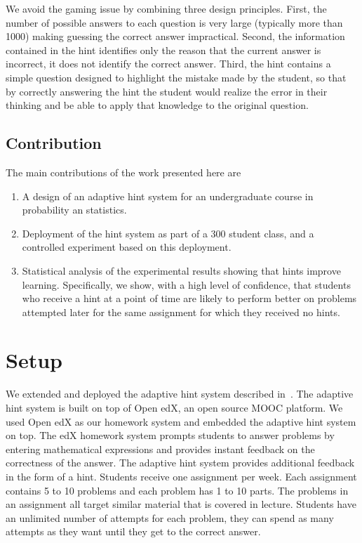 \documentclass{llncs2e/llncs}
\begin{document}
We avoid the gaming issue by combining three design principles. First, the number of possible answers to each question is very large (typically more than 1000) making guessing the correct answer impractical.  Second, the information contained in the hint
identifies only the reason that the current answer is incorrect, it does not identify the correct answer. Third, the hint contains a
simple question designed to highlight the mistake made by the student, so that by correctly answering the hint the student would realize the error in their thinking and be able to apply that knowledge to the original question.


\subsection*{Contribution}

The main contributions of the work presented here are
\begin{enumerate}
\item
A design of an adaptive hint system for an undergraduate course in
probability an statistics.
\item
Deployment of the hint system as part of a 300 student class, and a
controlled experiment based on this deployment.
\item
Statistical analysis of the experimental results showing that hints
improve learning. Specifically, we show, with a high level of
confidence, that students who receive a hint at a point of time are
likely to perform better on problems attempted later for the same
assignment for which they received no hints.
\end{enumerate}

\section{Setup}

We extended and deployed the adaptive hint system described
in~\cite{ElkherjFreund14}.  The adaptive hint system is built on top
of Open edX, an open source MOOC platform. We used Open edX as our
homework system and embedded the adaptive hint system on top. The edX
homework system prompts students to answer problems by entering
mathematical expressions and provides instant feedback on the
correctness of the answer. The adaptive hint system provides
additional feedback in the form of a hint. Students receive one
assignment per week. Each assignment contains 5 to 10 problems and
each problem has 1 to 10 parts. The problems in an assignment all
target similar material that is covered in lecture. Students have an
unlimited number of attempts for each problem, they can spend as many
attempts as they want until they get to the correct answer.
\end{document}
